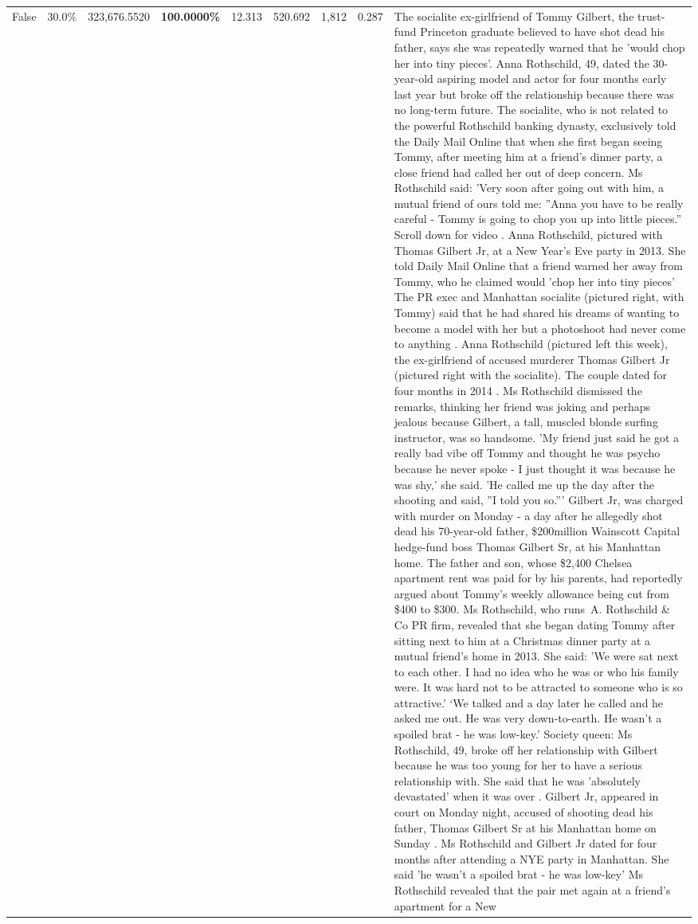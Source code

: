 \begin{table}[H]
\begin{tabular}{lllrlllll}
False & 30.0\% & 323,676.5520 & \bfseries \color{red} 100.0000\% & 12.313 & 520.692 & 1,812 & 0.287 & The socialite ex-girlfriend of Tommy Gilbert, the trust-fund Princeton graduate believed to have shot dead his father, says she was repeatedly warned that he 'would chop her into tiny pieces'. Anna Rothschild, 49, dated the 30-year-old aspiring model and actor for four months early last year but broke off the relationship because there was no long-term future. The socialite, who is not related to the powerful Rothschild banking dynasty, exclusively told the Daily Mail Online that when she first began seeing Tommy, after meeting him at a friend's dinner party, a close friend had called her out of deep concern. Ms Rothschild said: 'Very soon after going out with him, a mutual friend of ours told me: ''Anna you have to be really careful - Tommy is going to chop you up into little pieces.'' Scroll down for video . Anna Rothschild, pictured with Thomas Gilbert Jr, at a New Year's Eve party in 2013. She told Daily Mail Online that a friend warned her away from Tommy, who he claimed would 'chop her into tiny pieces' The PR exec and Manhattan socialite (pictured right, with Tommy) said that he had shared his dreams of wanting to become a model with her but a photoshoot had never come to anything . Anna Rothschild (pictured left this week), the ex-girlfriend of accused murderer Thomas Gilbert Jr (pictured right with the socialite). The couple dated for four months in 2014 . Ms Rothschild dismissed the remarks, thinking her friend was joking and perhaps jealous because Gilbert, a tall, muscled blonde surfing instructor, was so handsome. 'My friend just said he got a really bad vibe off Tommy and thought he was psycho because he never spoke - I just thought it was because he was shy,' she said. 'He called me up the day after the shooting and said, ''I told you so.''' Gilbert Jr, was charged with murder on Monday - a day after he allegedly shot dead his 70-year-old father, \$200million Wainscott Capital hedge-fund boss Thomas Gilbert Sr, at his Manhattan home. The father and son, whose \$2,400 Chelsea apartment rent was paid for by his parents, had reportedly argued about Tommy's weekly allowance being cut from \$400 to \$300. Ms Rothschild, who runs A. Rothschild \& Co PR firm, revealed that she began dating Tommy after sitting next to him at a Christmas dinner party at a mutual friend's home in 2013. She said: 'We were sat next to each other. I had no idea who he was or who his family were. It was hard not to be attracted to someone who is so attractive.' ‘We talked and a day later he called and he asked me out. He was very down-to-earth. He wasn’t a spoiled brat - he was low-key.’ Society queen: Ms Rothschild, 49, broke off her relationship with Gilbert because he was too young for her to have a serious relationship with. She said that he was 'absolutely devastated' when it was over . Gilbert Jr, appeared in court on Monday night, accused of shooting dead his father, Thomas Gilbert Sr at his Manhattan home on Sunday . Ms Rothschild and Gilbert Jr dated for four months after attending a NYE party in Manhattan. She said 'he wasn't a spoiled brat - he was low-key' Ms Rothschild revealed that the pair met again at a friend’s apartment for a New 
\end{tabular}
\end{table}
